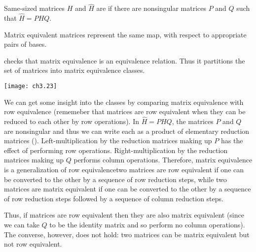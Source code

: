 \begin{definition}
\label{def:MatEquiv}
Same-sized matrices \( H \) and \( \hat{H} \) are
%
if there are nonsingular matrices \( P \) and \( Q \) such that
$\hat{H}=PHQ$.
\end{definition}

\begin{corollary}
\label{le:MatEqIsSameMap}
Matrix equivalent matrices represent the same map, with respect to appropriate
pairs of bases.
\end{corollary}

 checks that
matrix equivalence is an equivalence relation.
Thus it  partitions 
the set of matrices into matrix equivalence classes.
\begin{center}
  \texttt{[image: ch3.23]}
\end{center}
We can get some insight into the classes by comparing matrix equivalence
with row equivalence
(rememeber that matrices are row equivalent when they can be reduced to each
other by row operations).
In $\hat{H}=PHQ$, the matrices $P$ and $Q$ are nonsingular and 
thus we can write each as a product of elementary reduction matrices
().
Left-multiplication by the reduction matrices making up $P$
has the effect of performing row operations.
Right-multiplication by the reduction matrices making up $Q$
performs column operations.
Therefore, matrix equivalence is a generalization of row equivalence\Dash two
matrices are row equivalent if one can be converted to the other by
a sequence of row reduction steps, while
two matrices are matrix equivalent if one can be converted to the other by a 
sequence of row reduction steps followed by a sequence of column reduction
steps. 

Thus, if matrices are row equivalent then they are also
matrix equivalent (since we can take $Q$ to be the identity matrix and so 
perform no column operations).
The converse, however, does not hold:
two matrices can be matrix equivalent but not row equivalent.

